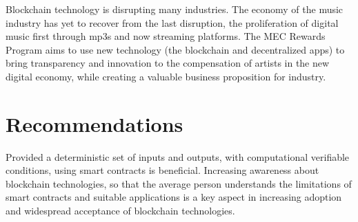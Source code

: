 \documentclass[12pt,tightenlines,letterpaper]{scrartcl}
\begin{document}
	
   Blockchain technology is disrupting many industries. The economy of the music industry has yet to recover from the last disruption, the proliferation of digital music first through mp3s and now streaming platforms. The MEC Rewards Program aims to use new technology (the blockchain and decentralized apps) to bring transparency and innovation to the compensation of artists in the new digital economy, while creating a valuable business proposition for industry.
\newpage
%
\section{Recommendations}
	
	Provided a deterministic set of inputs and outputs, with computational verifiable conditions, using smart contracts is beneficial. Increasing awareness about \gls{blockchain} technologies, so that the average person understands the limitations of smart contracts and suitable applications is a key aspect in increasing adoption and widespread acceptance of \gls{blockchain} technologies.

\renewcommand\bibname{References} %

\newpage 
 \printbibliography
 
\linespread{1}
\end{document}
